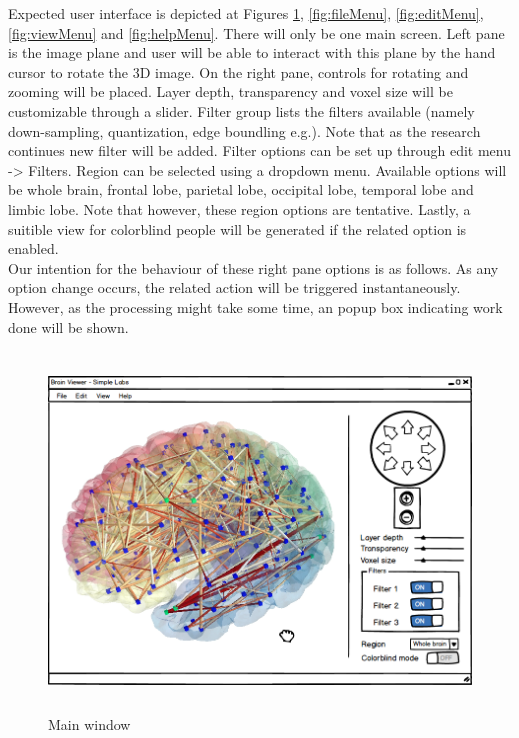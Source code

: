 Expected user interface is depicted at Figures \ref{fig:mainWindow}, \ref{fig:fileMenu}, \ref{fig:editMenu}, \ref{fig:viewMenu} and \ref{fig:helpMenu}. There will only be one main screen. Left pane is the image plane and user will be able to interact with this plane by the hand cursor to rotate the 3D image. On the right pane, controls for rotating and zooming will be placed. Layer depth, transparency and voxel size will be customizable through a slider. Filter group lists the filters available (namely down-sampling, quantization, edge boundling e.g.). Note that as the research continues new filter will be added. Filter options can be set up through edit menu -> Filters. Region can be selected using a dropdown menu. Available options will be whole brain, frontal lobe, parietal lobe, occipital lobe, temporal lobe and limbic lobe. Note that however, these region options are tentative. Lastly, a suitible view for colorblind people will be generated if the related option is enabled. \\

Our intention for the behaviour of these right pane options is as follows. As any option change occurs, the related action will be triggered instantaneously. However, as the processing might take some time, an popup box indicating work done will be shown.


\begin{figure}[h!]
\centering
\includegraphics[width=16cm,height=9.5cm]{images/mockup1.png}
\caption{Main window}
\label{fig:mainWindow}
\end{figure}


